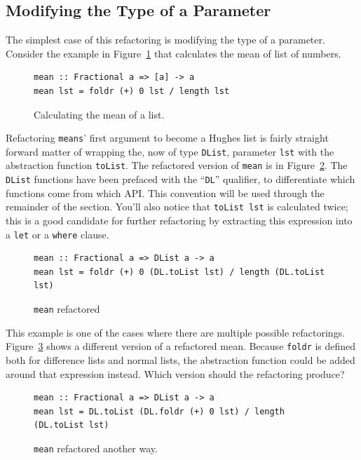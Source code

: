 \subsection{Modifying the Type of a Parameter}

The simplest case of this refactoring is modifying the type of a parameter. Consider the example in Figure~\ref{mean} that calculates the mean of list of numbers. 

\begin{figure}[t]
\begin{lstlisting}
mean :: Fractional a => [a] -> a
mean lst = foldr (+) 0 lst / length lst
\end{lstlisting} 
\caption{Calculating the mean of a list.}
\label{mean}
\end{figure}

Refactoring \texttt{means}' first argument to become a Hughes list is fairly straight forward matter of wrapping the, now of type \texttt{DList}, parameter \texttt{lst} with the abstraction function \texttt{toList}. The refactored version of \texttt{mean} is in Figure~\ref{meanRef}. The \texttt{DList} functions have been prefaced with the ``\texttt{DL}'' qualifier, to differentiate which functions come from which API. This convention will be used through the remainder of the section. You'll also notice that \texttt{toList lst} is calculated twice; this is a good candidate for further refactoring by extracting this expression into a \texttt{let} or a \texttt{where} clause. 

\begin{figure}[t]
\begin{lstlisting}
mean :: Fractional a => DList a -> a
mean lst = foldr (+) 0 (DL.toList lst) / length (DL.toList lst)
\end{lstlisting}  
\caption{\texttt{mean} refactored}
\label{meanRef} 
\end{figure}

This example is one of the cases where there are multiple possible refactorings. Figure~\ref{meanRef2} shows a different version of a refactored mean. Because \texttt{foldr} is defined both for difference lists and normal lists, the abstraction function could be added around that expression instead. Which version should the refactoring produce?

\begin{figure}[t]
\begin{lstlisting}
mean :: Fractional a => DList a -> a
mean lst = DL.toList (DL.foldr (+) 0 lst) / length (DL.toList lst)
\end{lstlisting}  
\caption{\texttt{mean} refactored another way.}
\label{meanRef2}
\end{figure}  

